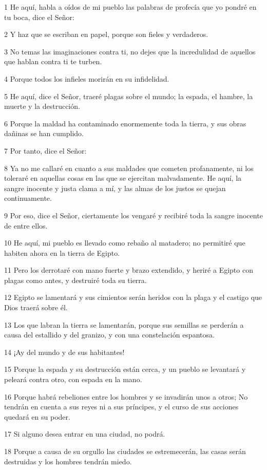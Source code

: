 \par 1 He aquí, habla a oídos de mi pueblo las palabras de profecía que yo pondré en tu boca, dice el Señor:
\par 2 Y haz que se escriban en papel, porque son fieles y verdaderos.
\par 3 No temas las imaginaciones contra ti, no dejes que la incredulidad de aquellos que hablan contra ti te turben.
\par 4 Porque todos los infieles morirán en su infidelidad.
\par 5 He aquí, dice el Señor, traeré plagas sobre el mundo; la espada, el hambre, la muerte y la destrucción.
\par 6 Porque la maldad ha contaminado enormemente toda la tierra, y sus obras dañinas se han cumplido.
\par 7 Por tanto, dice el Señor:
\par 8 Ya no me callaré en cuanto a sus maldades que cometen profanamente, ni los toleraré en aquellas cosas en las que se ejercitan malvadamente. He aquí, la sangre inocente y justa clama a mí, y las almas de los justos se quejan continuamente.
\par 9 Por eso, dice el Señor, ciertamente los vengaré y recibiré toda la sangre inocente de entre ellos.
\par 10 He aquí, mi pueblo es llevado como rebaño al matadero; no permitiré que habiten ahora en la tierra de Egipto.
\par 11 Pero los derrotaré con mano fuerte y brazo extendido, y heriré a Egipto con plagas como antes, y destruiré toda su tierra.
\par 12 Egipto se lamentará y sus cimientos serán heridos con la plaga y el castigo que Dios traerá sobre él.
\par 13 Los que labran la tierra se lamentarán, porque sus semillas se perderán a causa del estallido y del granizo, y con una constelación espantosa.
\par 14 ¡Ay del mundo y de sus habitantes!
\par 15 Porque la espada y su destrucción están cerca, y un pueblo se levantará y peleará contra otro, con espada en la mano.
\par 16 Porque habrá rebeliones entre los hombres y se invadirán unos a otros; No tendrán en cuenta a sus reyes ni a sus príncipes, y el curso de sus acciones quedará en su poder.
\par 17 Si alguno desea entrar en una ciudad, no podrá.
\par 18 Porque a causa de su orgullo las ciudades se estremecerán, las casas serán destruidas y los hombres tendrán miedo.
